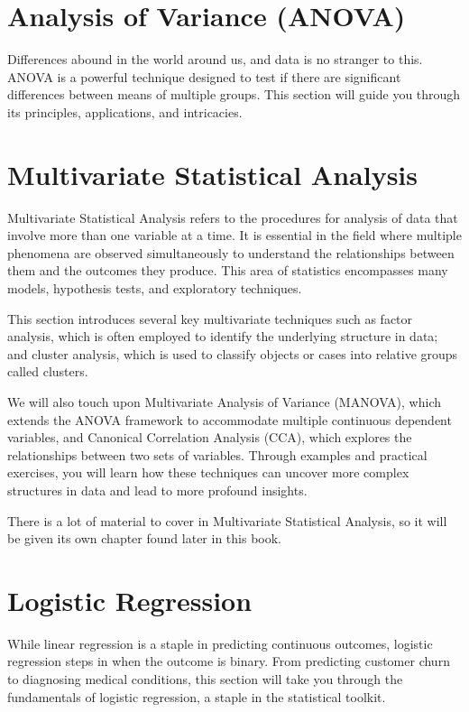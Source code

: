 \documentclass[a4paper,12pt]{book}
\newcounter{example}
\begin{document}
\section{Analysis of Variance (ANOVA)}
Differences abound in the world around us, and data is no stranger to this. ANOVA is a powerful technique designed to test if there are significant differences between means of multiple groups. This section will guide you through its principles, applications, and intricacies.

\section{Multivariate Statistical Analysis}
Multivariate Statistical Analysis refers to the procedures for analysis of data that involve more than one variable at a time. It is essential in the field where multiple phenomena are observed simultaneously to understand the relationships between them and the outcomes they produce. This area of statistics encompasses many models, hypothesis tests, and exploratory techniques.

This section introduces several key multivariate techniques such as factor analysis, which is often employed to identify the underlying structure in data; and cluster analysis, which is used to classify objects or cases into relative groups called clusters.

We will also touch upon Multivariate Analysis of Variance (MANOVA), which extends the ANOVA framework to accommodate multiple continuous dependent variables, and Canonical Correlation Analysis (CCA), which explores the relationships between two sets of variables. Through examples and practical exercises, you will learn how these techniques can uncover more complex structures in data and lead to more profound insights.

There is a lot of material to cover in Multivariate Statistical Analysis, so it will be given its own chapter found later in this book.

\section{Logistic Regression}
While linear regression is a staple in predicting continuous outcomes, logistic regression steps in when the outcome is binary. From predicting customer churn to diagnosing medical conditions, this section will take you through the fundamentals of logistic regression, a staple in the statistical toolkit.
\end{document}
